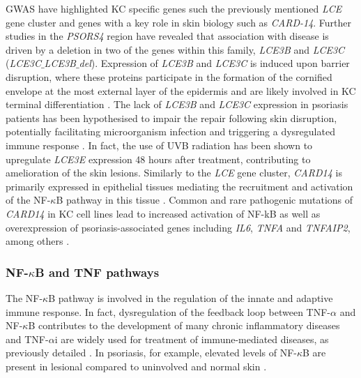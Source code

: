 GWAS have highlighted KC specific genes such the previously mentioned \textit{LCE} gene cluster and genes with a key role in skin biology such as \textit{CARD-14}. Further studies in the \textit{PSORS4} region have revealed that association with disease is driven by a deletion in two of the genes within this family, \textit{LCE3B} and \textit{LCE3C} (\textit{LCE3C$\_ $LCE3B$\_ $del})\parencite{Cid2009}. Expression of \textit{LCE3B} and \textit{LCE3C} is induced upon barrier disruption, where these proteins participate in the formation of the cornified envelope at the most external layer of the epidermis and are likely involved in KC terminal differentiation \parencite{Bergboer2011}. 
The lack of \textit{LCE3B} and \textit{LCE3C} expression in psoriasis patients has been hypothesised to impair the repair following skin disruption, potentially facilitating microorganism infection and triggering a dysregulated immune response \parencite{Bergboer2011}. In fact, the use of UVB radiation has been shown to upregulate \textit{LCE3E} expression 48 hours after treatment, contributing to amelioration of the skin lesions\parencite{Jackson2005}. %
Similarly to the \textit{LCE} gene cluster, \textit{CARD14} is primarily expressed in epithelial tissues mediating the recruitment and activation of the NF-$\kappa$B pathway in this tissue \parencite{Blonska2011}. Common and rare pathogenic mutations of \textit{CARD14} in KC cell lines lead to increased activation of NF-kB as well as overexpression of psoriasis-associated genes including \textit{IL6}, \textit{TNFA} and \textit{TNFAIP2}, among others \parencite{Jordan2012b}.



\subsubsection*{NF-$\kappa$B and TNF pathways}

The NF-$\kappa$B pathway is involved in the regulation of the innate and adaptive immune response. In fact, dysregulation of the feedback loop between TNF-$\alpha$ and NF-$\kappa$B contributes to the development of many chronic inflammatory diseases and TNF-$\alpha$i are widely used for treatment of immune-mediated diseases, as previously detailed \parencite{Liu2017}. In psoriasis, for example, elevated levels of NF-$\kappa$B are present in lesional compared to uninvolved and normal skin \parencite{Lizzul2005}. 

